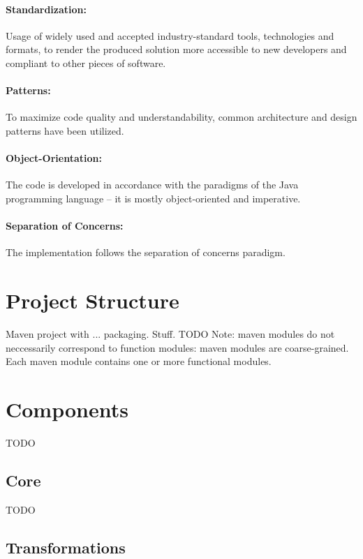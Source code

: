 \paragraph{Standardization:} Usage of widely used and accepted industry-standard tools, technologies and formats, to render the produced solution more accessible to new developers and compliant to other pieces of software.

\paragraph{Patterns:} To maximize code quality and understandability, common architecture and design patterns have been utilized.

\paragraph{Object-Orientation:} The code is developed in accordance with the paradigms of the Java programming language -- it is mostly object-oriented and imperative.

\paragraph{Separation of Concerns:} The implementation follows the separation of concerns paradigm.

\section{Project Structure}
\label{sec:impl:structure}

Maven project with ... packaging. Stuff. TODO Note: maven modules do not neccessarily correspond to function modules: maven modules are coarse-grained. Each maven module contains one or more functional modules.

\section{Components}
\label{sec:impl:components}

TODO

\subsection{Core}

TODO

\subsection{Transformations}

